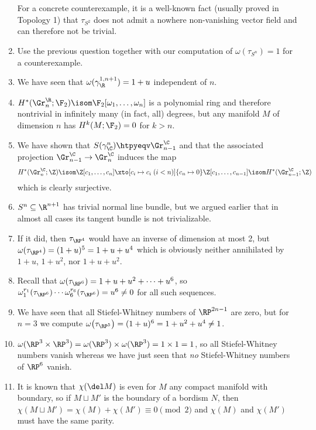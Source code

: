 \begin{answers}
\begin{enumerate}
			For a concrete counterexample, it is a well-known fact (usually proved in Topology 1) that $\tau_{S^2}$ does not admit a nowhere non-vanishing vector field and can therefore not be trivial.
		\item {} Use the previous question together with our computation of $\omega(\tau_{S^n}) = 1$ for a counterexample.
		\item We have seen that $\omega(\gamma_\R^{1, n + 1}) = 1 + u$ independent of $n$.
		\item {} $H^*(\Gr_n^\R; \F_2) \isom \F_2[\omega_1, \ldots, \omega_n]$ is a polynomial ring and therefore nontrivial in infinitely many (in fact, all) degrees, but any manifold $M$ of dimension $n$ has $H^k(M; \F_2) = 0$ for $k > n$.
		\item {} We have shown that $S(\gamma_\C^n) \htpyeqv \Gr^\C_{n - 1}$ and that the associated projection $\Gr_{n - 1}^\C \to \Gr_n^\C$ induces the map
			\begin{equation*}
				H^*(\Gr_n^\C; \Z) \isom \Z[c_1, \ldots, c_n] \xto[c_i \mapsto c_i\; (i < n)]{c_n \mapsto 0} \Z[c_1, \ldots, c_{n - 1}] \isom H^*(\Gr_{n - 1}^\C; \Z) 
			\end{equation*}
			which is clearly surjective.
		\item {} $S^n \subseteq \R^{n + 1}$ has trivial normal line bundle, but we argued earlier that in almost all cases its tangent bundle is not trivializable.
		\item {} If it did, then $\tau_{\RP^4}$ would have an inverse of dimension at most 2, but $\omega(\tau_{\RP^4}) = (1 + u)^5 = 1 + u + u^4$ which is obviously neither annihilated by $1 + u$, $1 + u^2$, nor $1 + u + u^2$.
		\item {} Recall that $\omega(\tau_{\RP^6}) = 1 + u + u^2 + \cdots + u^6$, so $\omega_1^{r_1}(\tau_{\RP^6}) \cdots \omega_6^{r_6}(\tau_{\RP^6}) = u^6 \neq 0$ for all such sequences.
		\item {} We have seen that all Stiefel-Whitney numbers of $\RP^{2n - 1}$ are zero, but for $n = 3$ we compute $\omega\big(\tau_{\RP^5}\big) = (1 + u)^6 = 1 + u^2 + u^4 \neq 1$.
		\item {} $\omega(\RP^3 \times \RP^3) = \omega(\RP^3) \times \omega(\RP^3) = 1 \times 1 = 1$, so all Stiefel-Whitney numbers vanish whereas we have just seen that \emph{no} Stiefel-Whitney numbers of $\RP^6$ vanish.
		\item {} It is known that $\chi(\del M)$ is even for $M$ any compact manifold with boundary, so if $M \sqcup M'$ is the boundary of a bordism $N$, then $\chi(M \sqcup M') = \chi(M) + \chi(M') \equiv 0 \pmod 2$ and $\chi(M)$ and $\chi(M')$ must have the same parity.


\end{enumerate}
\end{answers}
